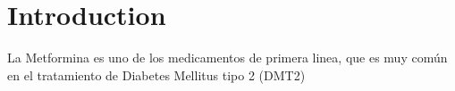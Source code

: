 \chapter{Introduction}
\label{Introduction}
La Metformina es uno de los medicamentos de primera linea, que es  muy común en el tratamiento de Diabetes Mellitus tipo 2 (DMT2)